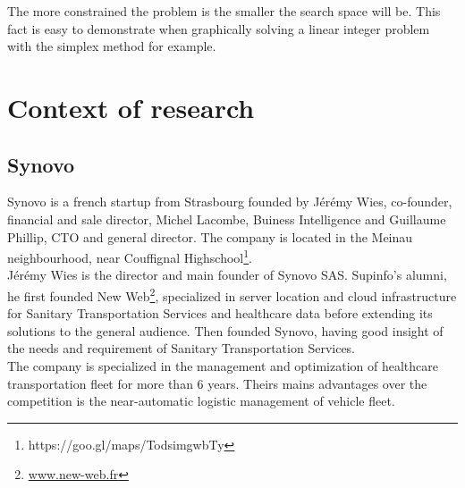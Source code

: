 \documentclass[12pt]{memoir}
\begin{document}
\bigskip
The more constrained the problem is the smaller the search space will be. This fact
is easy to demonstrate when graphically solving a linear integer problem with the
simplex\cite{nelder1965simplex} method for example.\\

\newpage

\section{Context of research}
\subsection{Synovo} %

Synovo is a french startup from Strasbourg founded by Jérémy Wies, co-founder,
financial and sale director, Michel Lacombe, Buiness Intelligence and Guillaume
Phillip, CTO and general director. The company is located in the Meinau
neighbourhood, near Couffignal Highschool\footnote{https://goo.gl/maps/TodsimgwbTy}.\\
Jérémy Wies is the director and main founder of Synovo SAS. Supinfo's alumni, he
first founded New Web\footnote{\url{www.new-web.fr}}, specialized in server location
and cloud infrastructure for Sanitary Transportation Services and healthcare data
before extending its solutions to the general audience. Then founded Synovo, having good insight of the needs and requirement of Sanitary Transportation Services.\\
The company is specialized in the management and optimization of healthcare
transportation fleet for more than 6 years. Theirs mains advantages over the
competition is the near-automatic logistic management of vehicle fleet. 
\bigskip
\end{document}
